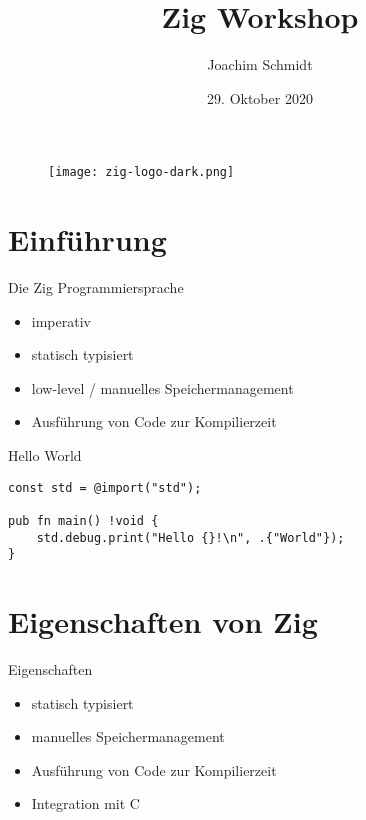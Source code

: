 \documentclass{beamer}
\title{Zig Workshop}
\author{Joachim Schmidt}
\date{29. Oktober 2020}
\begin{document}

\begin{frame}{}
    \begin{figure}
        \centering
        \texttt{[image: zig-logo-dark.png]}
        \caption{\cite{logo}}
        \label{fig:logo}
    \end{figure}
\end{frame}

\begin{frame}{}
    \tableofcontents
\end{frame}

\section{Einführung}

\begin{frame}{Die Zig Programmiersprache}
    \begin{itemize}
        \item imperativ
        \item statisch typisiert
        \item low-level / manuelles Speichermanagement
        \item Ausführung von Code zur Kompilierzeit
    \end{itemize}
\end{frame}

\begin{frame}[fragile]{Hello World}
\begin{verbatim}
const std = @import("std");

pub fn main() !void {
    std.debug.print("Hello {}!\n", .{"World"});
}
\end{verbatim}
\end{frame}

\section{Eigenschaften von Zig}

\begin{frame}{Eigenschaften}
    \begin{itemize}
        \item statisch typisiert
        \item manuelles Speichermanagement
        \item Ausführung von Code zur Kompilierzeit
        \item Integration mit C
    \end{itemize}
\end{frame}
\end{document}
